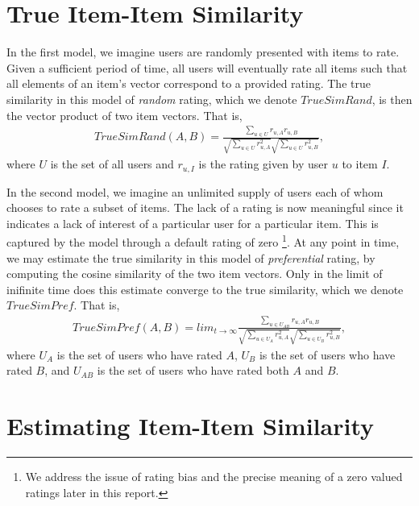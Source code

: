 \documentclass[11pt]{article}
\begin{document}
\section*{True Item-Item Similarity}

In the first model, we imagine users are randomly presented with items to rate.
Given a sufficient period of time, all users will eventually rate all items such
that all elements of an item's vector correspond to a provided rating. The true
similarity in this model of {\em random} rating, which we denote $TrueSimRand$,
is then the vector product of two item vectors. That is,
\begin{align}
TrueSimRand(A, B) = \frac{\sum\limits_{u\in U}
r_{u,A}r_{u,B}}{\sqrt{\sum\limits_{u\in U} r_{u,A}^2}
\sqrt{\sum\limits_{u\in U} r_{u,B}^2}},
\end{align}
where $U$ is the set of all users and $r_{u,I}$ is the rating given by user $u$
to item $I$.

In the second model, we imagine an unlimited supply of users each of whom
chooses to rate a subset of items. The lack of a rating is now meaningful since
it indicates a lack of interest of a particular user for a particular item. This
is captured by the model through a default rating of zero \footnote{We address
the issue of rating bias and the precise meaning of a zero valued ratings later
in this report.}. At any point in time, we may estimate the true similarity in
this model of {\em preferential} rating, by computing the cosine similarity of
the two item vectors. Only in the limit of inifinite time does this estimate
converge to the true similarity, which we denote $TrueSimPref$.  That is,
\begin{align}
TrueSimPref(A, B) = lim_{t\to\infty}\frac{\sum\limits_{u\in U_{AB}}
r_{u,A}r_{u,B}}{\sqrt{\sum\limits_{u\in U_A} r_{u,A}^2}
\sqrt{\sum\limits_{u\in U_B} r_{u,B}^2}},
\end{align}
where $U_A$ is the set of users who have rated $A$, $U_B$ is the set of users
who have rated $B$, and $U_{AB}$ is the set of users who have rated both $A$ and
$B$.

\section*{Estimating Item-Item Similarity}
\end{document}
